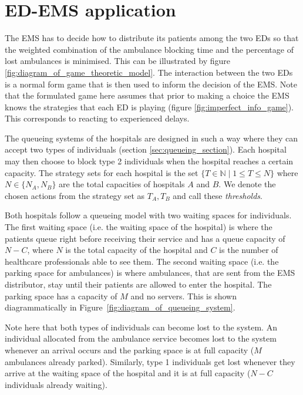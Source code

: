 \section{ED-EMS application}\label{sec:game_ems_es_application}

The EMS has to decide how to distribute its patients among the two EDs so that
the weighted combination of the ambulance blocking time and the percentage of
lost ambulances is minimised.
This can be illustrated by figure \ref{fig:diagram_of_game_theoretic_model}.
The interaction between the two
EDs is a normal form game that is then used to inform the decision of the EMS.
Note that the formulated game here assumes that prior to making a choice the
EMS knows the strategies that each ED is playing (figure
\ref{fig:imperfect_info_game}).
This corresponds to reacting to experienced delays.

The queueing systems of the hospitals are designed in such a way where they can
accept two types of individuals (section \ref{sec:queueing_section}).
Each hospital may then choose to block type 2 individuals
when the hospital reaches a certain capacity.
The strategy sets for each hospital is the set
\( \{T \in \mathbb{N} \;|\; 1 \leq T \leq N\} \) where \(N \in\{N_A, N_B\}\) are
the total capacities of hospitals \(A\) and \(B\).
We denote the chosen actions from the strategy set as \(T_A, T_B\) and call
these \textit{thresholds}.

Both hospitals follow a queueing model with two waiting spaces for
individuals.
The first waiting space (i.e. the waiting space of the hospital) is where the
patients queue right before receiving
their service and has a queue capacity of \( N - C \), where \(N\) is the total
capacity of the hospital and \(C\) is the number of healthcare
professionals able to see them.
The second waiting space (i.e. the parking space for ambulances) is where
ambulances, that are sent from the
EMS distributor, stay until their patients are allowed to enter the hospital.
The parking space has a capacity of \(M\) and no servers.
This is shown diagrammatically in Figure~\ref{fig:diagram_of_queueing_system}.

Note here that both types of individuals can become lost to the system.
An individual allocated from the ambulance service becomes lost to the system
whenever
an arrival occurs and the parking space is at full capacity (\(M\)
ambulances already parked).
Similarly, type 1 individuals get lost whenever they arrive at the waiting
space of the hospital and it is at full capacity (\(N - C\) individuals already
waiting).
